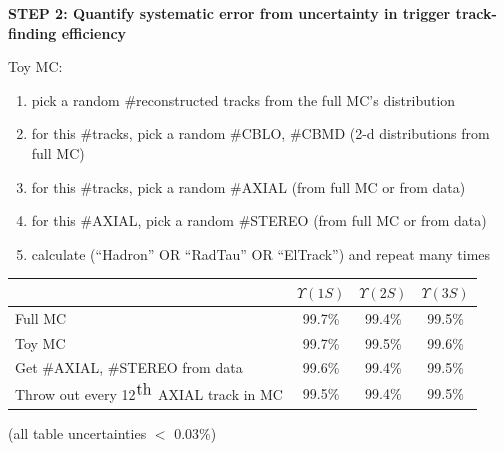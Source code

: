 \documentclass[landscape]{article}
\begin{document}
\vfill

\pagebreak

\vspace{1 cm}

{\bf STEP 2: Quantify systematic error from uncertainty in trigger
track-finding efficiency}

\vspace{1.5 cm}

Toy MC: 
\begin{enumerate}

  \item pick a random \#reconstructed tracks from the full MC's distribution

  \item for this \#tracks, pick a random \#CBLO, \#CBMD (2-d distributions from full MC)

  \item for this \#tracks, pick a random \#AXIAL (from full MC or from data)

  \item for this \#AXIAL, pick a random \#STEREO (from full MC or from data)

  \item calculate (``Hadron'' OR ``RadTau'' OR ``ElTrack'') and repeat many times

\end{enumerate}

\vfill

\begin{center}
  \renewcommand{\arraystretch}{1.25}
  \begin{tabular}{p{12 cm} c c c}
  & \mbox{\hspace{0.5 cm}} $\Upsilon(1S)$ \mbox{\hspace{0.5 cm}} & \mbox{\hspace{0.5 cm}} $\Upsilon(2S)$ \mbox{\hspace{0.5 cm}} & \mbox{\hspace{0.5 cm}} $\Upsilon(3S)$ \mbox{\hspace{0.5 cm}} \\\hline
  Full MC & 99.7\% & 99.4\% & 99.5\% \\
  Toy MC & 99.7\% & 99.5\% & 99.6\% \\
  Get \#AXIAL, \#STEREO from data & 99.6\% & 99.4\% & 99.5\% \\
  Throw out every 12$^{\mbox{\large th}}$ AXIAL track in MC & 99.5\% & 99.4\% & 99.5\% \\
  \end{tabular}
\end{center}
\begin{flushright} (all table uncertainties $<$ 0.03\%) \end{flushright}
\end{document}

